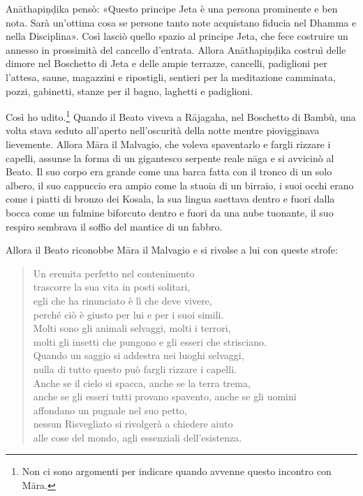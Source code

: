 Anāthapiṇḍika pensò: «Questo principe Jeta è una persona prominente e
ben nota. Sarà un’ottima cosa se persone tanto note acquistano fiducia
nel Dhamma e nella Disciplina». Così lasciò quello spazio al principe
Jeta, che fece costruire un annesso in prossimità del cancello
d’entrata. Allora Anāthapiṇḍika costruì delle dimore nel Boschetto di
Jeta e delle ampie terrazze, cancelli, padiglioni per l’attesa, saune,
magazzini e ripostigli, sentieri per la meditazione camminata, pozzi,
gabinetti, stanze per il bagno, laghetti e padiglioni.




 Così ho udito.\footnote{Non ci sono argomenti per indicare quando avvenne questo incontro con Māra.} Quando il Beato viveva a
Rājagaha, nel Boschetto di Bambù, una volta stava seduto all’aperto
nell’oscurità della notte mentre piovigginava lievemente. Allora Māra il
Malvagio, che voleva spaventarlo e fargli rizzare i capelli, assunse la
forma di un gigantesco serpente reale nāga e si avvicinò al Beato. Il
suo corpo era grande come una barca fatta con il tronco di un solo
albero, il suo cappuccio era ampio come la stuoia di un birraio, i suoi
occhi erano come i piatti di bronzo dei Kosala, la sua lingua saettava
dentro e fuori dalla bocca come un fulmine biforcuto dentro e fuori da
una nube tuonante, il suo respiro sembrava il soffio del mantice di un
fabbro.


Allora il Beato riconobbe Māra il Malvagio e si rivolse a lui con queste
strofe:


\begin{quote}
Un eremita perfetto nel contenimento \\
trascorre la sua vita in posti solitari, \\
egli che ha rinunciato è lì che deve vivere, \\
perché ciò è giusto per lui e per i suoi simili. \\
Molti sono gli animali selvaggi, molti i terrori, \\
molti gli insetti che pungono e gli esseri che strisciano. \\
Quando un saggio si addestra nei luoghi selvaggi, \\
nulla di tutto questo può fargli rizzare i capelli. \\
Anche se il cielo si spacca, anche se la terra trema, \\
anche se gli esseri tutti provano spavento, anche se gli uomini \\
affondano un pugnale nel suo petto, \\
nessun Risvegliato si rivolgerà a chiedere aiuto \\
alle cose del mondo, agli essenziali dell’esistenza.
\end{quote}

